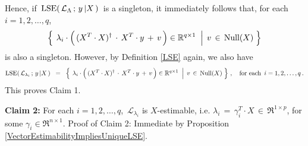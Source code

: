 Hence, if \,$\textnormal{LSE}\!\left(\,\mathcal{L}_{\Lambda} \,;\, y\,\vert X\,\right)$\, is a singleton,
it immediately follows that, for each \,$i = 1,2,\ldots,q$,
\begin{equation*}
\left\{\;
	\left.
	\lambda_{i} \cdot \left(\,(X^{T} \cdot X)^{\dagger} \overset{{\color{white}+}}{\cdot} X^{T} \cdot y \, + \, v \,\right)
	\in\Re^{q \times 1}
	\;\;\right\vert\;
	v \,\in\, \Null(X)
\;\right\}
\end{equation*}
is also a singleton.
However, by Definition \ref{LSE} again, we also have
\begin{equation*}
\lse\!\left(\,\mathcal{L}_{\lambda_{i}} \,;\, y\,\vert X\,\right)
\;\;=\;\;
	\left\{\;
		\left.
		\lambda_{i} \cdot \left(\,(X^{T} \cdot X)^{\dagger} \overset{{\color{white}+}}{\cdot} X^{T} \cdot y \, + \, v \,\right)
		\in\Re^{q \times 1}
		\;\;\right\vert\;
		v \,\in\, \Null(X)
	\;\right\}\,,
	\quad
	\textnormal{for each \,$i = 1,2,\ldots,q$}\,.
\end{equation*}
This proves Claim 1.

\vskip 0.5cm
\noindent
\textbf{Claim 2:}\quad
For each $i = 1,2,\ldots,q$, \,$\mathcal{L}_{\lambda_{i}}$ is $X$-estimable, 
i.e. $\lambda_{i} \,=\, \gamma_{i}^{T} \cdot X \,\in\, \Re^{1 \times p}$, for some $\gamma_{i} \in \Re^{n \times 1}$.
\vskip 0.2cm
\noindent
Proof of Claim 2:\quad
Immediate by Proposition \ref{VectorEstimabilityImpliesUniqueLSE}.

